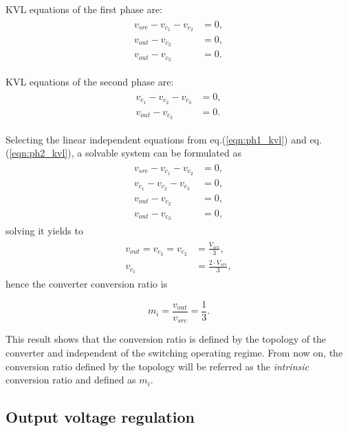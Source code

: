 KVL equations of the first phase are:
\begin{align}
\label{eqn:ph1_kvl}
\begin{split}
  v_{src} - v_{c_1} - v_{c_2} &=0, \\
  v_{out} - v_{c_2}  &=0,\\
  v_{out} - v_{c_3}  &=0.
\end{split}
\end{align}

KVL equations of the second phase are:
\begin{align}
\label{eqn:ph2_kvl}
\begin{split}
  v_{c_1} - v_{c_2} - v_{c_3} &=0, \\
  v_{out} - v_{c_3}  &=0.
\end{split}
\end{align}

Selecting the linear independent equations from eq.(\ref{eqn:ph1_kvl}) and eq.(\ref{eqn:ph2_kvl}), a solvable system can be formulated as
\begin{align}
\label{eqn:sys_kvl}
\begin{split}
  v_{src} - v_{c_1} - v_{c_2} &=0, \\
  v_{c_1} - v_{c_2} - v_{c_3} &=0, \\
  v_{out} - v_{c_2}  &=0,\\
  v_{out} - v_{c_3}  &=0,
\end{split}
\end{align}
solving it yields to
\begin{align}
\label{eqn:sol_kvl}
\begin{split}
  v_{out} =  v_{c_3} = v_{c_2} &=\frac{V_{src}}{3} , \\
  v_{c_1} &=\frac{2 \cdot V_{src}}{3} ,
\end{split}
\end{align}
hence the converter conversion ratio is

\begin{equation}
\label{eqn:m_kvl}
m_i = \frac{v_{out}}{v_{src}} = \frac{1}{3}.
\end{equation}

This result shows that the conversion ratio is defined by the topology of the converter and independent of the switching operating regime. From now on, the conversion ratio defined by the topology will be referred as the \emph{intrinsic} conversion ratio and defined as $m_i$.

\subsection{Output voltage regulation}

